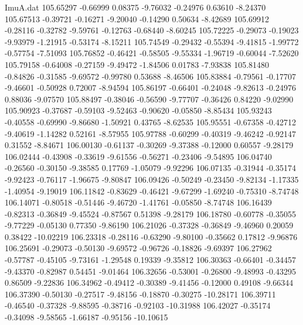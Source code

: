 \begin{filecontents}{ImuA.dat}
 105.65297   -0.66999    0.08375   -9.76032   -0.24976    0.63610   -8.24370
 105.67513   -0.39721   -0.16271   -9.20040   -0.14290    0.50634   -8.42689
 105.69912   -0.28116   -0.32782   -9.59761   -0.12763   -0.68440   -8.60245
 105.72225   -0.29073   -0.19023   -9.93979   -1.21915   -0.53174   -8.15211
 105.74549   -0.29432   -0.55394   -9.41815   -1.99772   -0.57754   -7.51093
 105.76852   -0.46421   -0.58505   -9.55334   -1.96719   -0.60044   -7.52620
 105.79158   -0.64008   -0.27159   -9.49472   -1.84506    0.01783   -7.93838
 105.81480   -0.84826   -0.31585   -9.69572   -0.99780    0.53688   -8.46506
 105.83884   -0.79561   -0.17707   -9.46601   -0.50928    0.72007   -8.94594
 105.86197   -0.66401   -0.24048   -9.82613   -0.24976    0.88036   -9.07570
 105.88497   -0.38046   -0.56590   -9.77707   -0.36426    0.84220   -9.02990
 105.90923   -0.37687   -0.59103   -9.52463   -0.90620   -0.05850   -8.85434
 105.93243   -0.40558   -0.69990   -9.86680   -1.50921    0.43765   -8.62535
 105.95551   -0.67358   -0.42712   -9.40619   -1.14282    0.52161   -8.57955
 105.97788   -0.60299   -0.40319   -9.46242   -0.92147    0.31552   -8.84671
 106.00130   -0.61137   -0.30269   -9.37388   -0.12000    0.60557   -9.28179
 106.02444   -0.43908   -0.33619   -9.61556   -0.56271   -0.23406   -9.54895
 106.04740   -0.26560   -0.30150   -9.38585    0.17769   -1.05079   -9.92296
 106.07135   -0.31944   -0.35174   -9.92423   -0.76117   -1.96675   -9.80847
 106.09426   -0.50249   -0.23450   -9.82134   -1.17335   -1.40954   -9.19019
 106.11842   -0.83629   -0.46421   -9.67299   -1.69240   -0.75310   -8.74748
 106.14071   -0.80518   -0.51446   -9.46720   -1.41761   -0.05850   -8.74748
 106.16439   -0.82313   -0.36849   -9.45524   -0.87567    0.51398   -9.28179
 106.18780   -0.60778   -0.35055   -9.77229   -0.05130    0.77350   -9.86190
 106.21026   -0.37328   -0.36849   -9.46960    0.20059    0.38422  -10.02219
 106.23318   -0.28116   -0.63290   -9.80100   -0.35662    0.17812   -9.96876
 106.25691   -0.29073   -0.50130   -9.69572   -0.96726   -0.18826   -9.69397
 106.27962   -0.57787   -0.45105   -9.73161   -1.29548    0.19339   -9.35812
 106.30363   -0.66401   -0.34457   -9.43370   -0.82987    0.54451   -9.01464
 106.32656   -0.53001   -0.26800   -9.48993   -0.43295    0.86509   -9.22836
 106.34962   -0.49412   -0.30389   -9.41456   -0.12000    0.49108   -9.66344
 106.37390   -0.50130   -0.27517   -9.48156   -0.18870   -0.30275  -10.28171
 106.39711   -0.46540   -0.37328   -9.88595   -0.38716   -0.92103  -10.31988
 106.42027   -0.35174   -0.34098   -9.58565   -1.66187   -0.95156  -10.10615

\end{filecontents}
